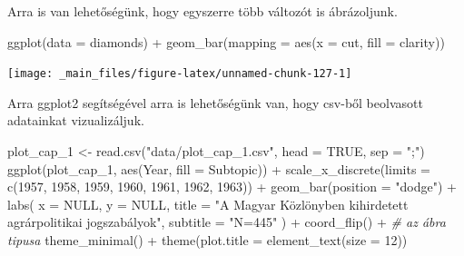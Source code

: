 \documentclass[
]{book}
\newenvironment{Shaded}{\begin{snugshade}}{\end{snugshade}}
\newcommand{\AttributeTok}[1]{\textcolor[rgb]{0.77,0.63,0.00}{#1}}
\newcommand{\CommentTok}[1]{\textcolor[rgb]{0.56,0.35,0.01}{\textit{#1}}}
\newcommand{\ConstantTok}[1]{\textcolor[rgb]{0.00,0.00,0.00}{#1}}
\newcommand{\DecValTok}[1]{\textcolor[rgb]{0.00,0.00,0.81}{#1}}
\newcommand{\FunctionTok}[1]{\textcolor[rgb]{0.00,0.00,0.00}{#1}}
\newcommand{\NormalTok}[1]{#1}
\newcommand{\OtherTok}[1]{\textcolor[rgb]{0.56,0.35,0.01}{#1}}
\newcommand{\SpecialCharTok}[1]{\textcolor[rgb]{0.00,0.00,0.00}{#1}}
\newcommand{\StringTok}[1]{\textcolor[rgb]{0.31,0.60,0.02}{#1}}
\begin{document}
Arra is van lehetőségünk, hogy egyszerre több változót is ábrázoljunk.

\begin{Shaded}
\begin{Highlighting}[]
\FunctionTok{ggplot}\NormalTok{(}\AttributeTok{data =}\NormalTok{ diamonds) }\SpecialCharTok{+}
  \FunctionTok{geom\_bar}\NormalTok{(}\AttributeTok{mapping =} \FunctionTok{aes}\NormalTok{(}\AttributeTok{x =}\NormalTok{ cut, }\AttributeTok{fill =}\NormalTok{ clarity))}
\end{Highlighting}
\end{Shaded}

\begin{center}\texttt{[image: \_main\_files/figure-latex/unnamed-chunk-127-1]} \end{center}

Arra ggplot2 segítségével arra is lehetőségünk van, hogy csv-ből
beolvasott adatainkat vizualizáljuk.

\begin{Shaded}
\begin{Highlighting}[]
\NormalTok{plot\_cap\_1 }\OtherTok{\textless{}{-}} \FunctionTok{read.csv}\NormalTok{(}\StringTok{"data/plot\_cap\_1.csv"}\NormalTok{, }\AttributeTok{head =} \ConstantTok{TRUE}\NormalTok{, }\AttributeTok{sep =} \StringTok{";"}\NormalTok{)}
\FunctionTok{ggplot}\NormalTok{(plot\_cap\_1, }\FunctionTok{aes}\NormalTok{(Year, }\AttributeTok{fill =}\NormalTok{ Subtopic)) }\SpecialCharTok{+}
  \FunctionTok{scale\_x\_discrete}\NormalTok{(}\AttributeTok{limits =} \FunctionTok{c}\NormalTok{(}\DecValTok{1957}\NormalTok{, }\DecValTok{1958}\NormalTok{, }\DecValTok{1959}\NormalTok{, }\DecValTok{1960}\NormalTok{, }\DecValTok{1961}\NormalTok{, }\DecValTok{1962}\NormalTok{, }\DecValTok{1963}\NormalTok{)) }\SpecialCharTok{+}
  \FunctionTok{geom\_bar}\NormalTok{(}\AttributeTok{position =} \StringTok{"dodge"}\NormalTok{) }\SpecialCharTok{+}
  \FunctionTok{labs}\NormalTok{(}
    \AttributeTok{x =} \ConstantTok{NULL}\NormalTok{, }\AttributeTok{y =} \ConstantTok{NULL}\NormalTok{,}
    \AttributeTok{title =} \StringTok{"A Magyar Közlönyben kihirdetett agrárpolitikai jogszabályok"}\NormalTok{,}
    \AttributeTok{subtitle =} \StringTok{"N=445"}
\NormalTok{  ) }\SpecialCharTok{+}
  \FunctionTok{coord\_flip}\NormalTok{() }\SpecialCharTok{+} \CommentTok{\# az ábra tipusa}
  \FunctionTok{theme\_minimal}\NormalTok{() }\SpecialCharTok{+}
  \FunctionTok{theme}\NormalTok{(}\AttributeTok{plot.title =} \FunctionTok{element\_text}\NormalTok{(}\AttributeTok{size =} \DecValTok{12}\NormalTok{))}
\end{Highlighting}
\end{Shaded}
\end{document}
